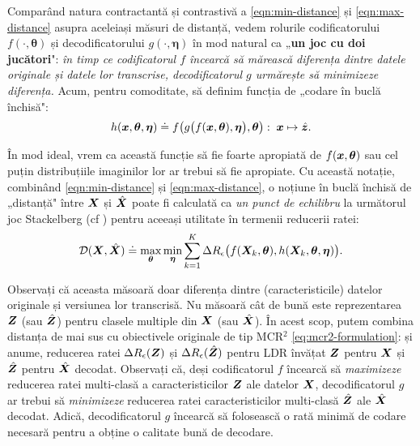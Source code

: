 \documentclass[../../book-main_ro.tex]{subfiles}
\begin{document}
Comparând natura contractantă și contrastivă a \eqref{eqn:min-distance} și \eqref{eqn:max-distance} asupra aceleiași măsuri de distanță, vedem rolurile codificatorului $f(\cdot, \bm \theta)$ și decodificatorului $g(\cdot, \bm \eta)$ în mod natural ca „{\bf un joc cu doi jucători}": {\em în timp ce codificatorul $f$ încearcă să mărească diferența dintre datele originale și datele lor transcrise, decodificatorul $g$ urmărește să minimizeze diferența.} Acum, pentru comoditate, să definim funcția de „codare în buclă închisă":
\begin{equation}
    h(\bm{x}, \bm \theta,\bm \eta) \doteq f\big(g\big(f(\bm{x}, \bm \theta), \bm \eta\big), \bm \theta\big): \; \bm{x} \mapsto \hat {\bm{z}}.
\end{equation}

În mod ideal, vrem ca această funcție să fie foarte apropiată de $f(\bm{x}, \bm \theta)$ sau cel puțin distribuțiile imaginilor lor ar trebui să fie apropiate. Cu această notație, combinând \eqref{eqn:min-distance} și \eqref{eqn:max-distance}, o noțiune în buclă închisă de „distanță" între $\bm{X}$ și $\hat {\bm{X}}$ poate fi calculată ca {\em un punct de echilibru} la următorul joc Stackelberg (cf ) pentru aceeași utilitate în termenii reducerii ratei:
\begin{equation}
\mathcal{D}(\bm{X}, \hat {\bm{X}}) \doteq  \max_{\bm \theta} \min_{\bm \eta} \sum_{k=1}^K \Delta R_\epsilon\big(f(\bm{X}_k,\bm \theta), h(\bm{X}_k,\bm \theta,\bm \eta)\big).
    \label{eq:MCR2-GAN-pair}
\end{equation}

Observați că aceasta măsoară doar diferența dintre (caracteristicile) datelor originale și versiunea lor transcrisă. Nu măsoară cât de bună este reprezentarea $\bm{Z}$ (sau $\hat {\bm{Z}}$) pentru clasele multiple din $\bm{X}$ (sau $\hat {\bm{X}}$). În acest scop, putem combina distanța de mai sus cu obiectivele originale de tip MCR$^2$ \eqref{eq:mcr2-formulation}: și anume, reducerea ratei $\Delta R_\epsilon(\bm{Z})$ și $\Delta R_\epsilon(\hat {\bm{Z}})$ pentru LDR învățat $\bm{Z}$ pentru $\bm{X}$ și $\hat {\bm{Z}}$ pentru $\hat {\bm{X}}$ decodat. Observați că, deși codificatorul $f$ încearcă să {\em maximizeze} reducerea ratei multi-clasă a caracteristicilor $\bm{Z}$ ale datelor $\bm{X}$, decodificatorul $g$ ar trebui să {\em minimizeze} reducerea ratei caracteristicilor multi-clasă $\hat {\bm{Z}}$ ale $\hat {\bm{X}}$ decodat. Adică, decodificatorul $g$ încearcă să folosească o rată minimă de codare necesară pentru a obține o calitate bună de decodare.
\end{document}
